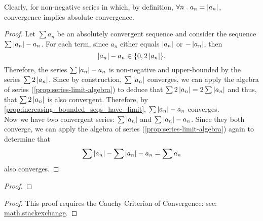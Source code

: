 \documentclass[../MathsNotesBase.tex]{subfiles}
\begin{document}
{{		Clearly, for non-negative series in which, by definition, ${ \forall n \;.\; a_n = \left\lvert a_n\right\rvert }$, convergence implies absolute convergence.}
	
		
		\bigskip
		\begin{proof}
			Let ${ \sum a_n }$ be an absolutely convergent sequence and consider the sequence ${ \sum \left\lvert a_n\right\rvert - a_n }$. For each term, since $a_n$ either equals $\left\lvert a_n\right\rvert$ or $-\left\lvert a_n\right\rvert$, then
			\[ \left\lvert a_n\right\rvert - a_n \in \{ 0, 2\left\lvert a_n\right\rvert \}. \]
			Therefore, the series ${ \sum \left\lvert a_n\right\rvert - a_n }$ is non-negative and upper-bounded by the series ${ \sum 2 \left\lvert a_n\right\rvert }$. Since by construction, ${ \sum \left\lvert a_n\right\rvert }$ converges, we can apply the algebra of series (\autoref{prop:series-limit-algebra}) to deduce that ${ \sum 2 \left\lvert a_n\right\rvert = 2 \sum \left\lvert a_n\right\rvert }$ and thus, that ${ \sum 2 \left\lvert a_n\right\rvert }$ is also convergent. Therefore, by \autoref{prop:increasing_bounded_seqs_have_limit}, ${ \sum \left\lvert a_n\right\rvert - a_n }$ converges.\\
			
			Now we have two convergent series: ${ \sum \left\lvert a_n\right\rvert }$ and ${ \sum \left\lvert a_n\right\rvert - a_n }$. Since they both converge, we can apply the algebra of series (\autoref{prop:series-limit-algebra}) again to determine that
			\[ \sum \left\lvert a_n\right\rvert - \sum \left\lvert a_n\right\rvert - a_n = \sum a_n \]
			also converges.
		\end{proof}
		
		\biggerskip
		\begin{proof}
		\end{proof}
	
		\bigskip
		\begin{proof}
			This proof requires the Cauchy Criterion of Convergence: see: \href{https://math.stackexchange.com/questions/475841/absolutely-convergent-series-has-constant-sum}{math.stackexchange}. 
		\end{proof}
		
}
\end{document}
